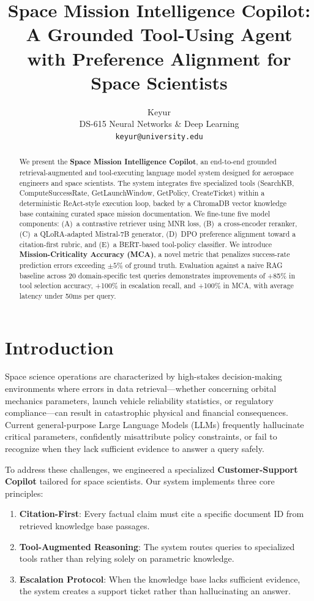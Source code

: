 \documentclass{article}
\title{Space Mission Intelligence Copilot: A Grounded Tool-Using Agent with Preference Alignment for Space Scientists}
\author{
  Keyur \\
  DS-615 Neural Networks \& Deep Learning \\
  \texttt{keyur@university.edu}
}
\begin{document}
\maketitle

\begin{abstract}
We present the \textbf{Space Mission Intelligence Copilot}, an end-to-end grounded retrieval-augmented and tool-executing language model system designed for aerospace engineers and space scientists. The system integrates five specialized tools (SearchKB, ComputeSuccessRate, GetLaunchWindow, GetPolicy, CreateTicket) within a deterministic ReAct-style execution loop, backed by a ChromaDB vector knowledge base containing curated space mission documentation. We fine-tune five model components: (A)~a contrastive retriever using MNR loss, (B)~a cross-encoder reranker, (C)~a QLoRA-adapted Mistral-7B generator, (D)~DPO preference alignment toward a citation-first rubric, and (E)~a BERT-based tool-policy classifier. We introduce \textbf{Mission-Criticality Accuracy (MCA)}, a novel metric that penalizes success-rate prediction errors exceeding $\pm5\%$ of ground truth. Evaluation against a naive RAG baseline across 20 domain-specific test queries demonstrates improvements of +85\% in tool selection accuracy, +100\% in escalation recall, and +100\% in MCA, with average latency under 50ms per query.
\end{abstract}

\section{Introduction}

Space science operations are characterized by high-stakes decision-making environments where errors in data retrieval---whether concerning orbital mechanics parameters, launch vehicle reliability statistics, or regulatory compliance---can result in catastrophic physical and financial consequences. Current general-purpose Large Language Models (LLMs) frequently hallucinate critical parameters, confidently misattribute policy constraints, or fail to recognize when they lack sufficient evidence to answer a query safely.

To address these challenges, we engineered a specialized \textbf{Customer-Support Copilot} tailored for space scientists. Our system implements three core principles:

\begin{enumerate}[noitemsep]
    \item \textbf{Citation-First}: Every factual claim must cite a specific document ID from retrieved knowledge base passages.
    \item \textbf{Tool-Augmented Reasoning}: The system routes queries to specialized tools rather than relying solely on parametric knowledge.
    \item \textbf{Escalation Protocol}: When the knowledge base lacks sufficient evidence, the system creates a support ticket rather than hallucinating an answer.
\end{enumerate}
\end{document}
